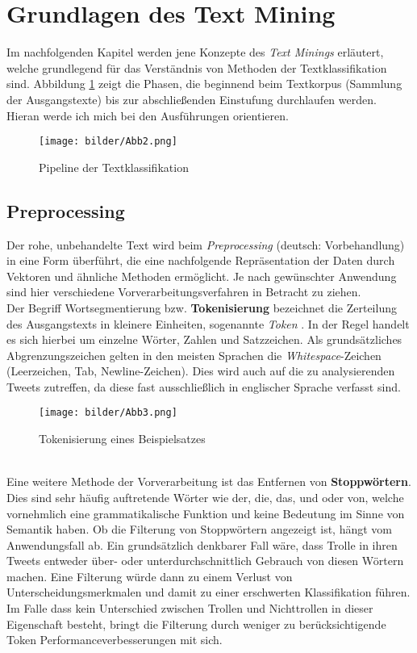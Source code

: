 \section{Grundlagen des Text Mining}\raggedbottom
Im nachfolgenden Kapitel werden jene Konzepte des \textit{Text Minings} erläutert, welche grundlegend für das Verständnis von Methoden der Textklassifikation sind. Abbildung \ref{pipetk} zeigt die Phasen, die beginnend beim Textkorpus (Sammlung der Ausgangstexte) bis zur abschließenden Einstufung durchlaufen werden. Hieran werde ich mich bei den Ausführungen orientieren.
\begin{figure}[htb]
	\begin{center}
		\texttt{[image: bilder/Abb2.png]}
		\caption{Pipeline der Textklassifikation \citep{Kow19}  }\label{pipetk}
	\end{center}
\end{figure}
\subsection{Preprocessing}
Der rohe, unbehandelte Text wird beim \textit{Preprocessing} (deutsch: Vorbehandlung) in eine Form überführt, die eine nachfolgende Repräsentation der Daten durch Vektoren und ähnliche Methoden ermöglicht. Je nach gewünschter Anwendung sind hier verschiedene Vorverarbeitungsverfahren in Betracht zu ziehen.\\
Der Begriff Wortsegmentierung bzw. \textbf{Tokenisierung} bezeichnet die Zerteilung des Ausgangstexts in kleinere Einheiten, sogenannte \textit{Token} \citep{MannSch99}. In der Regel handelt es sich hierbei um einzelne Wörter, Zahlen und Satzzeichen. Als grundsätzliches Abgrenzungszeichen gelten in den meisten Sprachen die \textit{Whitespace}-Zeichen (Leerzeichen, Tab, Newline-Zeichen). Dies wird auch auf die zu analysierenden Tweets zutreffen, da diese fast ausschließlich in englischer Sprache verfasst sind.\\
\begin{figure}[htb]
	\begin{center}
		\texttt{[image: bilder/Abb3.png]}
		\caption{Tokenisierung eines Beispielsatzes}\label{tokenization}
	\end{center}
\end{figure}\\
Eine weitere Methode der Vorverarbeitung ist das Entfernen von \textbf{Stoppwörtern}. Dies sind sehr häufig auftretende Wörter wie \glqq der\grqq, \glqq die\grqq, \glqq das\grqq, \glqq und\grqq{} oder \glqq von\grqq, welche vornehmlich eine grammatikalische Funktion und keine Bedeutung im Sinne von Semantik haben. Ob die Filterung von Stoppwörtern angezeigt ist, hängt vom Anwendungsfall ab. Ein grundsätzlich denkbarer Fall wäre, dass Trolle in ihren Tweets entweder über- oder unterdurchschnittlich Gebrauch von diesen Wörtern machen. Eine Filterung würde dann zu einem Verlust von Unterscheidungsmerkmalen und damit zu einer erschwerten Klassifikation führen. Im Falle dass kein Unterschied zwischen Trollen und Nichttrollen in dieser Eigenschaft besteht, bringt die Filterung durch weniger zu berücksichtigende Token Performanceverbesserungen mit sich.\\
